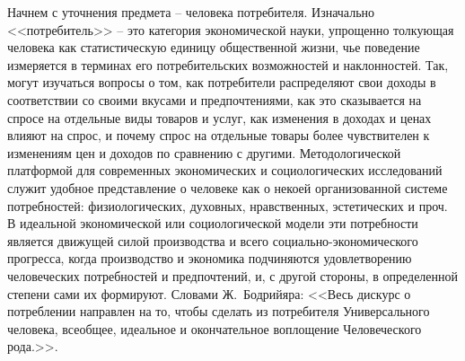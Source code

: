 Начнем с уточнения предмета -- человека потребителя. Изначально <<потребитель>> --
это категория экономической науки, упрощенно толкующая человека как
статистическую единицу общественной жизни, чье поведение измеряется в
терминах его потребительских возможностей и наклонностей. Так, могут изучаться
вопросы о том, как потребители распределяют свои доходы в соответствии со своими
вкусами и предпочтениями, как это сказывается на спросе на отдельные виды товаров
и услуг, как изменения в доходах и ценах влияют на спрос, и почему спрос на отдельные
товары более чувствителен к изменениям цен и доходов по сравнению с другими.
Методологической платформой для современных экономических и социологических
исследований служит удобное представление о человеке как о некоей организованной
системе потребностей: физиологических, духовных, нравственных, эстетических и проч.
В идеальной экономической или социологической модели эти потребности является
движущей силой производства и всего социально-экономического прогресса, когда
производство и экономика подчиняются удовлетворению человеческих потребностей
и предпочтений, и, с другой стороны, в определенной степени сами их формируют\autocites{ballestrem1999}{book:bodriyar}{bunkina2000}{klein2003}{kuli2000}{livshits2001}{markuze1994}{maslow2011}{sibruk2005}{fukuyama2004}{alias2001}.
Словами Ж.~Бодрийяра: <<Весь дискурс о потреблении направлен на то, чтобы сделать
из потребителя Универсального человека, всеобщее, идеальное и окончательное
воплощение Человеческого рода.>>\autocite{bodriyar_society}.
